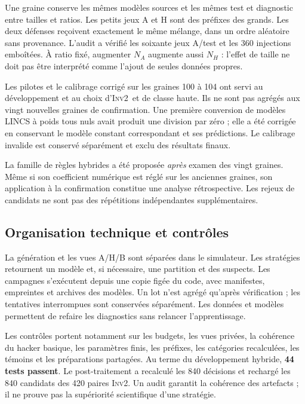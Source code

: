 \documentclass[11pt,a4paper]{article}
\newcommand{\Inv}{\textsc{Inv2}}
\begin{document}
Une graine conserve les mêmes modèles sources et les mêmes test et diagnostic
entre tailles et ratios. Les petits jeux A et H sont des préfixes des grands.
Les deux défenses reçoivent exactement le même mélange, dans un ordre aléatoire
sans provenance. L'audit a vérifié les soixante jeux A/test et les 360 injections
emboîtées. À ratio fixé, augmenter $N_A$ augmente aussi $N_H$ : l'effet de taille
ne doit pas être interprété comme l'ajout de seules données propres.

Les pilotes et le calibrage corrigé sur les graines 100 à 104 ont servi au
développement et au choix d'\Inv\ et de classe haute. Ils ne sont pas agrégés
aux vingt nouvelles graines de confirmation. Une première conversion de modèles
LINCS à poids tous nuls avait produit une division par zéro ; elle a été corrigée
en conservant le modèle constant correspondant et ses prédictions. Le calibrage
invalide est conservé séparément et exclu des résultats finaux.

La famille de règles hybrides a été proposée \emph{après} examen des vingt
graines. Même si son coefficient numérique est réglé sur les anciennes graines,
son application à la confirmation constitue une analyse rétrospective. Les
rejeux de candidats ne sont pas des répétitions indépendantes supplémentaires.

\subsection{Organisation technique et contrôles}

La génération et les vues A/H/B sont séparées dans le simulateur. Les stratégies
retournent un modèle et, si nécessaire, une partition et des suspects. Les
campagnes s'exécutent depuis une copie figée du code, avec manifestes, empreintes
et archives des modèles. Un lot n'est agrégé qu'après vérification ; les
tentatives interrompues sont conservées séparément. Les données et modèles
permettent de refaire les diagnostics sans relancer l'apprentissage.

Les contrôles portent notamment sur les budgets, les vues privées, la cohérence
du hacker basique, les paramètres finis, les préfixes, les catégories recalculées,
les témoins et les préparations partagées. Au terme du développement hybride,
\textbf{44 tests passent}. Le post-traitement a recalculé les 840 décisions et
rechargé les 840 candidats des 420 paires \Inv. Un audit garantit la cohérence
des artefacts ; il ne prouve pas la supériorité scientifique d'une stratégie.
\end{document}
